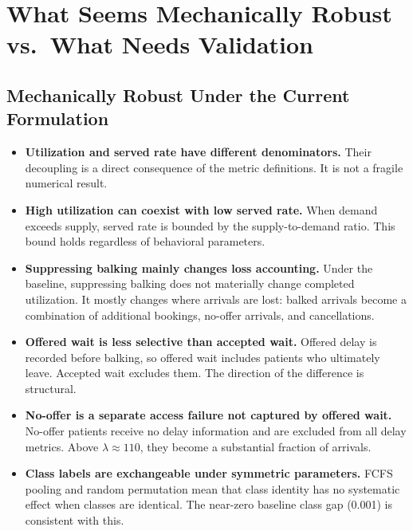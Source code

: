 \documentclass[11pt]{article}
\begin{document}
\section{What Seems Mechanically Robust vs.\ What Needs Validation}
\label{sec:checks}

\subsection{Mechanically Robust Under the Current Formulation}

\begin{itemize}[leftmargin=1.5em, itemsep=3pt]
\item \textbf{Utilization and served rate have different denominators.}
Their decoupling is a direct consequence of the metric definitions. It
is not a fragile numerical result.

\item \textbf{High utilization can coexist with low served rate.}
When demand exceeds supply, served rate is bounded by the supply-to-demand
ratio. This bound holds regardless of behavioral parameters.

\item \textbf{Suppressing balking mainly changes loss accounting.}
Under the baseline, suppressing balking does not materially change completed
utilization. It mostly changes where arrivals are lost: balked arrivals become
a combination of additional bookings, no-offer arrivals, and cancellations.

\item \textbf{Offered wait is less selective than accepted wait.}
Offered delay is recorded before balking, so offered wait includes patients
who ultimately leave. Accepted wait excludes them. The direction of the
difference is structural.

\item \textbf{No-offer is a separate access failure not captured by
offered wait.} No-offer patients receive no delay information and are
excluded from all delay metrics. Above $\lambda \approx 110$, they become
a substantial fraction of arrivals.

\item \textbf{Class labels are exchangeable under symmetric parameters.}
FCFS pooling and random permutation mean that class identity has no
systematic effect when classes are identical. The near-zero baseline class
gap (0.001) is consistent with this.


\end{itemize}
\end{document}
